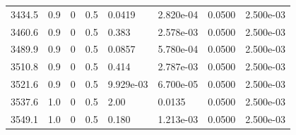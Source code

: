 \documentclass[preview]{standalone}
\begin{document}
{{{{\begin{tabular}{L{1.2cm}C{1.2cm} C{0.3cm}C{0.5cm} C{1.4cm}C{1.4cm} C{1.4cm}C{1.4cm}}
  3434.5  &   0.9  & 0     & 0.5 &  0.0419  & 2.820e-04  & 0.0500 &  2.500e-03   \\ 
  3460.6  &   0.9  & 0     & 0.5 &  0.383  & 2.578e-03  & 0.0500 &  2.500e-03   \\ 
  3489.9  &   0.9  & 0     & 0.5 &  0.0857  & 5.780e-04  & 0.0500 &  2.500e-03   \\ 
  3510.8  &   0.9  & 0     & 0.5 &  0.414  & 2.787e-03  & 0.0500 &  2.500e-03   \\ 
  3521.6  &   0.9  & 0     & 0.5 &  9.929e-03  & 6.700e-05  & 0.0500 &  2.500e-03   \\ 
  3537.6  &   1.0  & 0     & 0.5 &  2.00  & 0.0135  & 0.0500 &  2.500e-03   \\ 
  3549.1  &   1.0  & 0     & 0.5 &  0.180  & 1.213e-03  & 0.0500 &  2.500e-03   \\ 
\hline 
\end{tabular} 

}}}}
\end{document}
